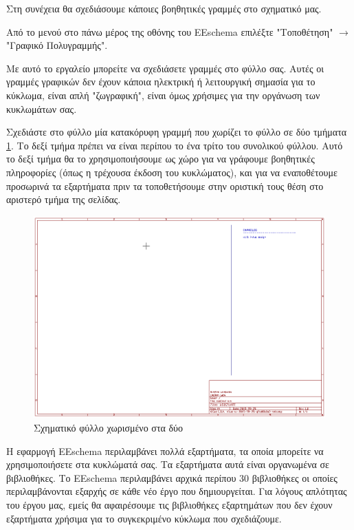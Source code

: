 \documentclass[a4paper]{article}
\begin{document}
Στη συνέχεια θα σχεδιάσουμε κάποιες βοηθητικές γραμμές στο σχηματικό μας.

Από το μενού στο πάνω μέρος της οθόνης του \textenglish{EEschema} επιλέξτε "Τοποθέτηση" $\rightarrow$ "Γραφικό Πολυγραμμής".

Με αυτό το εργαλείο μπορείτε να σχεδιάσετε γραμμές στο φύλλο σας. Αυτές οι γραμμές γραφικών δεν έχουν κάποια ηλεκτρική ή λειτουργική σημασία για το κύκλωμα, είναι απλή "ζωγραφική", είναι όμως χρήσιμες για την οργάνωση των κυκλωμάτων σας.

Σχεδιάστε στο φύλλο μία κατακόρυφη γραμμή που χωρίζει το φύλλο σε δύο τμήματα \ref{fig:eesch-main-lines}. Το δεξί τμήμα πρέπει να είναι περίπου το ένα τρίτο του συνολικού φύλλου. Αυτό το δεξί τμήμα θα το χρησιμοποιήσουμε ως χώρο για να γράφουμε  βοηθητικές πληροφορίες (όπως η τρέχουσα έκδοση του κυκλώματος), και για να εναποθέτουμε προσωρινά τα εξαρτήματα πριν τα τοποθετήσουμε στην οριστική τους θέση στο αριστερό τμήμα της σελίδας.

\begin{figure}
  \begin{center}
    \includegraphics[width=.9\textwidth]{img/eesch-main-lines.png}
    \caption{Σχηματικό φύλλο χωρισμένο στα δύο}
    \label{fig:eesch-main-lines}
  \end{center}
\end{figure}

Η εφαρμογή \textenglish{EEschema} περιλαμβάνει πολλά εξαρτήματα, τα οποία μπορείτε να χρησιμοποιήσετε στα κυκλώματά σας. Τα εξαρτήματα αυτά είναι οργανωμένα σε βιβλιοθήκες. Το \textenglish{EEschema} περιλαμβάνει αρχικά περίπου 30 βιβλιοθήκες οι οποίες περιλαμβάνονται εξαρχής σε κάθε νέο έργο που δημιουργείται. Για λόγους απλότητας του έργου μας, εμείς θα αφαιρέσουμε τις βιβλιοθήκες εξαρτημάτων που δεν έχουν εξαρτήματα χρήσιμα για το συγκεκριμένο κύκλωμα που σχεδιάζουμε.
\end{document}
